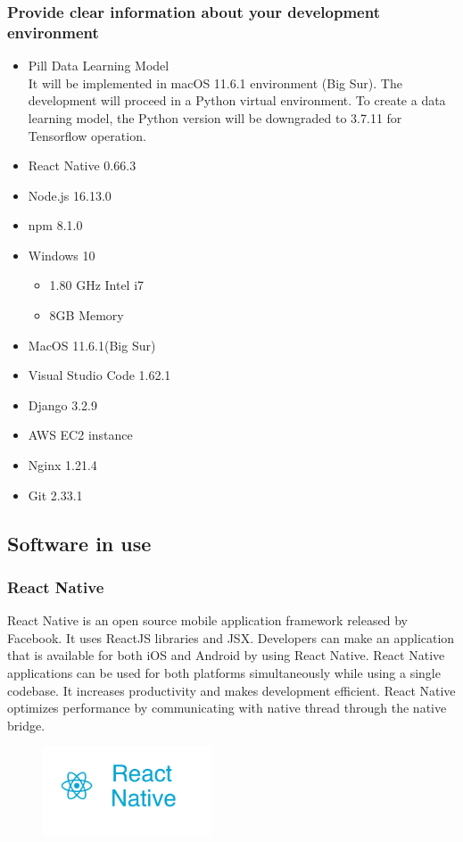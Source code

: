 \documentclass[conference]{IEEEtran}
\begin{document}
\subsubsection{Provide clear information about your development environment}
\begin{itemize}
  \item Pill Data Learning Model \\
It will be implemented in macOS 11.6.1 environment (Big Sur). The development will proceed in a Python virtual environment. To create a data learning model, the Python version will be downgraded to 3.7.11 for Tensorflow operation. 
  \item React Native 0.66.3
  \item Node.js 16.13.0
  \item npm 8.1.0
  \item Windows 10
  \begin{itemize}
         \item 1.80 GHz Intel i7
         \item 8GB Memory
       \end{itemize}
  \item MacOS 11.6.1(Big Sur)
  \item Visual Studio Code 1.62.1
  \item Django 3.2.9
  \item AWS EC2 instance
  \item Nginx 1.21.4
  \item Git 2.33.1
\end{itemize}

\subsection{Software in use}\label{AA}
\subsubsection{React Native}
React Native is an open source mobile application framework released by Facebook. It uses ReactJS libraries and JSX. Developers can make an application that is available for both  iOS and Android by using React Native. React Native applications can be used for both platforms simultaneously while using a single codebase. It increases productivity and makes development efficient. React Native optimizes performance by communicating with native thread through the native bridge. \\
\begin{figure}[h!]
\includegraphics[width=5cm]{imagefolder/react_native.png}
\caption{}
\label{fig:map}
\end{figure}
\end{document}
